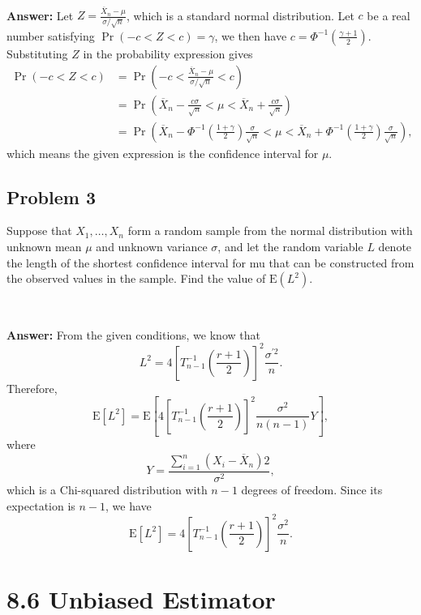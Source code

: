 \documentclass{article}
\begin{document}
\

\textbf{Answer:} Let $Z = \frac{\overline{X}_n - \mu}{\sigma/\sqrt{n}}$, which is a standard normal distribution. Let $c$ be a real number satisfying $\Pr(-c < Z < c) = \gamma$, we then have $c = \Phi^{-1}(\frac{\gamma + 1}{2})$. Substituting $Z$ in the probability expression gives
\begin{align*}
\Pr(-c < Z < c) &= \Pr(-c < \frac{\overline{X}_n - \mu}{\sigma/\sqrt{n}} < c) \\
&= \Pr(\overline{X}_n - \frac{c\sigma}{\sqrt{n}} < \mu < \overline{X}_n + \frac{c\sigma}{\sqrt{n}}) \\
&= \Pr(\overline{X}_n - \Phi^{-1} \left(\frac{1 + \gamma}{2} \right) \frac{\sigma}{\sqrt{n}} < \mu < \overline{X}_n + \Phi^{-1} \left(\frac{1 + \gamma}{2} \right) \frac{\sigma}{\sqrt{n}}),
\end{align*}
which means the given expression is the confidence interval for $\mu$.

\bigskip

\subsection*{Problem 3}
Suppose that $X_1, \dots , X_n$ form a random sample from the normal distribution with unknown mean $\mu$ and unknown variance $\sigma$, and let the random variable $L$ denote the length of the shortest confidence interval for mu that can be constructed from the observed values in the sample. Find the value of $\text{E}(L^2)$.

\

\textbf{Answer:} From the given conditions, we know that 
$$L^2=4 \left[T_{n-1}^{-1}\left(\frac{r+1}{2}\right) \right]^2 \frac{\sigma^{'2}}{n}.
$$
Therefore,
$$
\text{E}[L^2] =\text{E}\left[4 \left[T_{n-1}^{-1}\left(\frac{r+1}{2}\right) \right]^2 \frac{\sigma^2}{n(n-1)} Y \right],
$$
where 
$$
Y = \frac{\sum_{i=1}^n (X_i - \overline{X}_n)2}{\sigma^2},
$$ which is a Chi-squared distribution with $n -1$ degrees of freedom. Since its expectation is $n - 1$, we have
$$
\text{E}[L^2] = 4 \left[T_{n-1}^{-1}\left(\frac{r+1}{2}\right) \right]^2 \frac{\sigma^2}{n}.
$$

\newpage

\section*{8.6 Unbiased Estimator}
\end{document}
